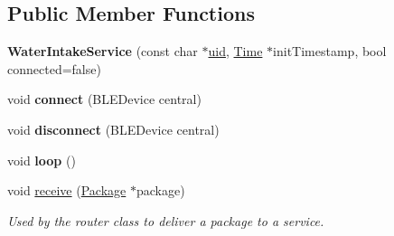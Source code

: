 \subsection*{Public Member Functions}
\begin{DoxyCompactItemize}
\item 
{\bfseries Water\+Intake\+Service} (const char $\ast$\hyperlink{class_bottle_buddy_1_1_embedded_1_1_pipeline_1_1_service_af290f9aa0a6dca36e802e615fab19f78}{uid}, \hyperlink{struct_bottle_buddy_1_1_embedded_1_1_pipeline_1_1_services_1_1_time}{Time} $\ast$init\+Timestamp, bool connected=false)\hypertarget{class_bottle_buddy_1_1_embedded_1_1_pipeline_1_1_services_1_1_water_intake_service_aee30f6a2fc93816ea0a9049ca486c455}{}\label{class_bottle_buddy_1_1_embedded_1_1_pipeline_1_1_services_1_1_water_intake_service_aee30f6a2fc93816ea0a9049ca486c455}

\item 
void {\bfseries connect} (B\+L\+E\+Device central)\hypertarget{class_bottle_buddy_1_1_embedded_1_1_pipeline_1_1_services_1_1_water_intake_service_a13a3eab54c6954571558cd39248d8a4c}{}\label{class_bottle_buddy_1_1_embedded_1_1_pipeline_1_1_services_1_1_water_intake_service_a13a3eab54c6954571558cd39248d8a4c}

\item 
void {\bfseries disconnect} (B\+L\+E\+Device central)\hypertarget{class_bottle_buddy_1_1_embedded_1_1_pipeline_1_1_services_1_1_water_intake_service_aaa47b5101bdf6b439f79496d1e68c4a4}{}\label{class_bottle_buddy_1_1_embedded_1_1_pipeline_1_1_services_1_1_water_intake_service_aaa47b5101bdf6b439f79496d1e68c4a4}

\item 
void {\bfseries loop} ()\hypertarget{class_bottle_buddy_1_1_embedded_1_1_pipeline_1_1_services_1_1_water_intake_service_adbc1a38d314fb9d071719ebc69fe1a71}{}\label{class_bottle_buddy_1_1_embedded_1_1_pipeline_1_1_services_1_1_water_intake_service_adbc1a38d314fb9d071719ebc69fe1a71}

\item 
void \hyperlink{class_bottle_buddy_1_1_embedded_1_1_pipeline_1_1_services_1_1_water_intake_service_abfa1b38af16fae314c3ba3f80b2bf785}{receive} (\hyperlink{class_bottle_buddy_1_1_embedded_1_1_pipeline_1_1_package}{Package} $\ast$package)
\begin{DoxyCompactList}\small\item\em Used by the router class to deliver a package to a service. \end{DoxyCompactList}\end{DoxyCompactItemize}
